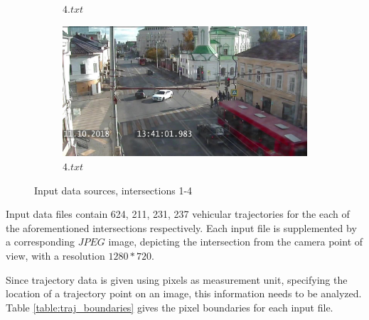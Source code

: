 \begin{figure}[!htb]
\begin{subfigure}[!htb]{0.23\textwidth}
		\caption{$4.txt$}
		\label{fig:is_3}
	\end{subfigure}
	\hfill
	\begin{subfigure}[!htb]{0.23\textwidth}
		\centering{}
		\includegraphics[width=\textwidth]{images/is-4.jpg}
		\caption{$4.txt$}
		\label{fig:is_4}
	\end{subfigure}
	\caption{Input data sources, intersections 1-4}
	\label{fig:is_all}
\end{figure}

Input data files contain 624, 211, 231, 237 vehicular trajectories for the each of the aforementioned intersections respectively. Each input file is supplemented by a corresponding $JPEG$ image, depicting the intersection from the camera point of view, with a resolution $1280 * 720$. 

Since trajectory data is given using pixels as measurement unit, specifying the location of a trajectory point on an image, this information needs to be analyzed. Table \ref{table:traj_boundaries} gives the pixel boundaries for each input file.


